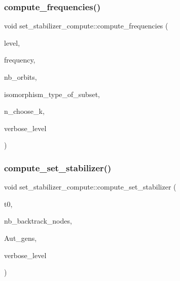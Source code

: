 \subsubsection{\texorpdfstring{compute\+\_\+frequencies()}{compute\_frequencies()}}
{\footnotesize\ttfamily void set\+\_\+stabilizer\+\_\+compute\+::compute\+\_\+frequencies (\begin{DoxyParamCaption}\item[{\mbox{\hyperlink{galois_8h_a09fddde158a3a20bd2dcadb609de11dc}{I\+NT}}}]{level,  }\item[{\mbox{\hyperlink{galois_8h_a09fddde158a3a20bd2dcadb609de11dc}{I\+NT}} $\ast$\&}]{frequency,  }\item[{\mbox{\hyperlink{galois_8h_a09fddde158a3a20bd2dcadb609de11dc}{I\+NT}} \&}]{nb\+\_\+orbits,  }\item[{\mbox{\hyperlink{galois_8h_a09fddde158a3a20bd2dcadb609de11dc}{I\+NT}} $\ast$\&}]{isomorphism\+\_\+type\+\_\+of\+\_\+subset,  }\item[{\mbox{\hyperlink{galois_8h_a09fddde158a3a20bd2dcadb609de11dc}{I\+NT}} \&}]{n\+\_\+choose\+\_\+k,  }\item[{\mbox{\hyperlink{galois_8h_a09fddde158a3a20bd2dcadb609de11dc}{I\+NT}}}]{verbose\+\_\+level }\end{DoxyParamCaption})}

\mbox{\label{classset__stabilizer__compute_ad4f92074322e98c7cd0ed5d4f8486b76}} 
\subsubsection{\texorpdfstring{compute\+\_\+set\+\_\+stabilizer()}{compute\_set\_stabilizer()}}
{\footnotesize\ttfamily void set\+\_\+stabilizer\+\_\+compute\+::compute\+\_\+set\+\_\+stabilizer (\begin{DoxyParamCaption}\item[{\mbox{\hyperlink{galois_8h_a09fddde158a3a20bd2dcadb609de11dc}{I\+NT}}}]{t0,  }\item[{\mbox{\hyperlink{galois_8h_a09fddde158a3a20bd2dcadb609de11dc}{I\+NT}} \&}]{nb\+\_\+backtrack\+\_\+nodes,  }\item[{\mbox{\hyperlink{classstrong__generators}{strong\+\_\+generators}} $\ast$\&}]{Aut\+\_\+gens,  }\item[{\mbox{\hyperlink{galois_8h_a09fddde158a3a20bd2dcadb609de11dc}{I\+NT}}}]{verbose\+\_\+level }\end{DoxyParamCaption})}

